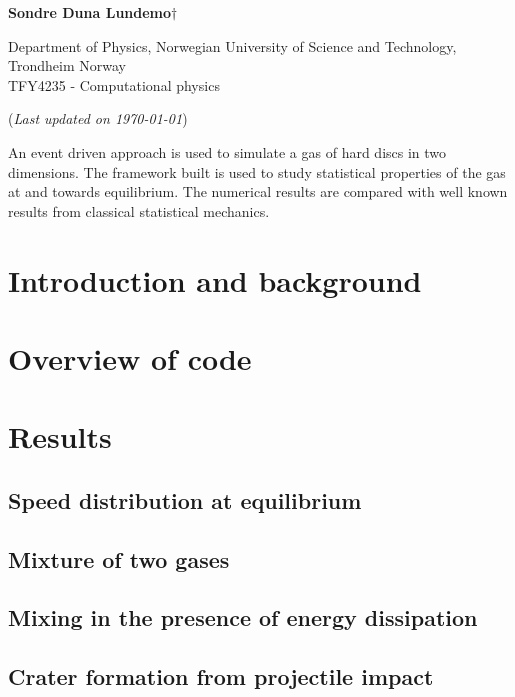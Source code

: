 


	
\begin{titlepage}
	\begin{center}
	\setlength{\parskip}{0em}
	\thispagestyle{titlepage}
	

	\vspace{4mm}
	
	\large{\textbf{Sondre Duna Lundemo}}$\dagger$
	
	\normalsize{Department of Physics, Norwegian University of Science and Technology, Trondheim Norway \\
	TFY4235 - Computational physics
	}

	(\textit{Last updated on \today})
	\end{center}

	\setlength{\parindent}{2em}An event driven approach is used to simulate a gas of hard discs in two dimensions. The framework built is used to study statistical properties of the gas at and towards equilibrium. The numerical results are compared with well known results from classical statistical mechanics. 
	
	

\end{titlepage}

\newpage
\setlength{\parskip}{0em}
\tableofcontents
\setlength{\parskip}{1em}
\newpage

\section{Introduction and background}



\section{Overview of code}



\section{Results}

\subsection{Speed distribution at equilibrium}\label{sec:eq}



\subsection{Mixture of two gases}\label{sec:mix1}

\subsection{Mixing in the presence of energy dissipation}\label{sec:mix2}

\subsection{Crater formation from projectile impact}\label{sec:crater}




